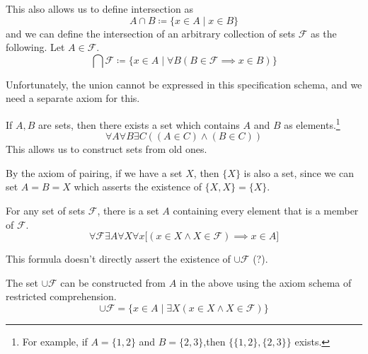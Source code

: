 \documentclass{article}
\begin{document}
    \begin{definition}[Intersection]
      This also allows us to define intersection as 
      \begin{equation}
        A \cap B \coloneqq \{x \in A \mid x \in B \}
      \end{equation} 
      and we can define the intersection of an arbitrary collection of sets $\mathcal{F}$ as the following. Let $A \in \mathcal{F}$.  
      \begin{equation}
        \bigcap \mathcal{F} \coloneqq \{x \in A \mid \forall B (B \in \mathcal{F} \implies x \in B) \}
      \end{equation}
    \end{definition}

    Unfortunately, the union cannot be expressed in this specification schema, and we need a separate axiom for this. 

    \begin{axiom}
      If $A, B$ are sets, then there exists a set which contains $A$ and $B$ as elements.\footnote{For example, if $A = \{1, 2\}$ and $B = \{2, 3\}$,then $\{\{1, 2\}, \{2, 3\}\}$ exists.}
      \begin{equation}
        \forall A \forall B \exists C((A \in C) \land (B \in C))
      \end{equation}
      This allows us to construct sets from old ones. 
    \end{axiom}

    \begin{theorem}
      By the axiom of pairing, if we have a set $X$, then $\{X\}$ is also a set, since we can set $A = B = X$ which asserts the existence of $\{X, X\} = \{X\}$. 
    \end{theorem}

    \begin{axiom}
      For any set of sets $\mathcal{F}$, there is a set $A$ containing every element that is a member of $\mathcal{F}$.
      \begin{equation}
        \forall \mathcal{F} \exists A \forall X \forall x \big[ (x \in X \land X \in \mathcal{F}) \implies x \in A \big]
      \end{equation}
    \end{axiom}

    This formula doesn't directly assert the existence of $\cup \mathcal{F}$ (?). 

    \begin{definition}[Union]
      The set $\cup \mathcal{F}$ can be constructed from $A$ in the above using the axiom schema of restricted comprehension. 
      \begin{equation}
        \cup \mathcal{F} = \{ x \in A \mid \exists X (x \in X \land X \in \mathcal{F} ) \}
      \end{equation}
    \end{definition}
\end{document}
